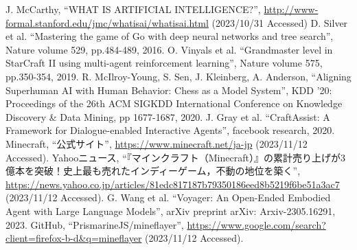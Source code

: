 
\begin{thebibliography}{99}
    J. McCarthy,
    ``WHAT IS ARTIFICIAL INTELLIGENCE?'', 
    \url{http://www-formal.stanford.edu/jmc/whatisai/whatisai.html} (2023/10/31 Accessed)
    D. Silver et al. 
    ``Mastering the game of Go with deep neural networks and tree search'', Nature volume 529, pp.484-489, 2016.
    O. Vinyals et al. ``Grandmaster level in StarCraft II using multi-agent reinforcement learning'', Nature volume 575, pp.350-354, 2019.
    R. McIlroy-Young, S. Sen, J. Kleinberg, A. Anderson,
    ``Aligning Superhuman AI with Human Behavior: Chess as a Model System'',
    KDD '20: Proceedings of the 26th ACM SIGKDD International Conference on Knowledge Discovery \& Data Mining, pp 1677-1687,
    2020.
    J. Gray et al.
    ``CraftAssist: A Framework for Dialogue-enabled Interactive Agents'',
    facebook research,
    2020.
    Minecraft, 
    ``公式サイト'', 
    \url{https://www.minecraft.net/ja-jp} (2023/11/12 Accessed).
    Yahooニュース,
    ``『マインクラフト（Minecraft）』の累計売り上げが3億本を突破！史上最も売れたインディーゲーム，不動の地位を築く'',
    \url{https://news.yahoo.co.jp/articles/81edc817187b79350186eed8b5219f6be51a3ac7} (2023/11/12 Accessed).
    G. Wang et al. 
    ``Voyager: An Open-Ended Embodied Agent with Large Language Models'', 
    arXiv preprint arXiv: Arxiv-2305.16291, 2023.
    GitHub, 
    ``PrismarineJS/mineflayer'', 
    \url{https://www.google.com/search?client=firefox-b-d&q=mineflayer} (2023/11/12 Accessed).

\end{thebibliography}
